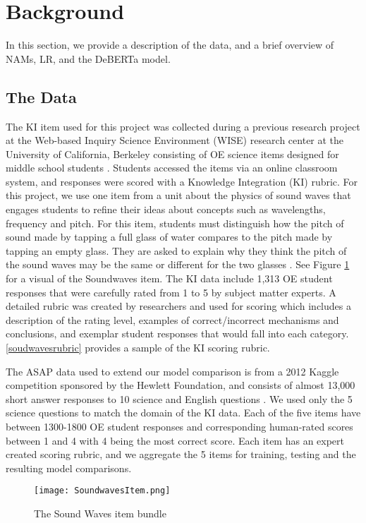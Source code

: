 \section{Background}
In this section, we provide a description of the data, and a brief overview of NAMs, LR, and the DeBERTa model. 
\subsection{The Data}
The KI item used for this project was collected during a previous research project at the Web-based Inquiry Science Environment (WISE) research center at the University of California, Berkeley consisting of OE science items designed for middle school students \cite{riordan2020empirical}. Students accessed the items via an online classroom system, and responses were scored with a Knowledge Integration (KI) rubric. For this project, we use one item from a unit about the physics of sound waves that engages students to refine their ideas about concepts such as wavelengths, frequency and pitch. For this item, students must distinguish how the pitch of sound made by tapping a full glass of water compares to the pitch made by tapping an empty glass. They are asked to explain why they think the pitch of the sound waves may be the same or different for the two glasses \cite{riordan2020empirical}. See Figure \ref{soudwavesitem} for a visual of the Soundwaves item. The KI data include 1,313 OE student responses that were carefully rated from 1 to 5 by subject matter experts. A detailed rubric was created by researchers and used for scoring which includes a description of the rating level, examples of correct/incorrect mechanisms and conclusions, and exemplar student responses that would fall into each category. \ref{soudwavesrubric} provides a sample of the KI scoring rubric.

The ASAP data used to extend our model comparison is from a 2012 Kaggle competition sponsored by the Hewlett Foundation, and consists of almost 13,000 short answer responses to 10 science and English questions \cite{prize2019hewlett}. We used only the 5 science questions to match the domain of the KI data. Each of the five items have between 1300-1800 OE student responses and corresponding human-rated scores between 1 and 4 with 4 being the most correct score. Each item has an expert created scoring rubric, and we aggregate the 5 items for training, testing and the resulting model comparisons.

\begin{figure}
\centering
  \texttt{[image: SoundwavesItem.png]}
  \caption{The Sound Waves item bundle}
  \label{soudwavesitem}
\end{figure}

